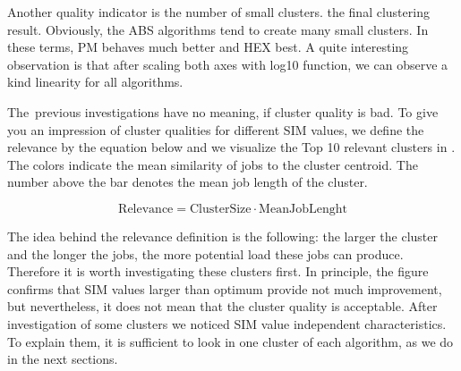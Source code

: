 \documentclass[]{llncs}
\begin{document}
Another quality indicator is the number of small clusters.
 the final clustering result.
Obviously, the ABS algorithms tend to create many small clusters.
In these terms, PM behaves much better and HEX best.
A quite interesting observation is that after scaling both axes with log10 function, we can observe a kind linearity for all algorithms.

The\ previous investigations have no meaning, if cluster quality is bad.
To give you an  impression of cluster qualities for different SIM values, we define the relevance by the equation below and we visualize the Top 10 relevant clusters in
.
The colors indicate the mean similarity of jobs to the cluster centroid.
The number above the bar denotes the mean job length of the cluster.

\begin{equation}
\text{Relevance} = \text{ClusterSize} \cdot \text{MeanJobLenght}
\end{equation}


The idea behind the relevance definition is the following: the larger the cluster and the longer the jobs, the more potential load these jobs can produce.
Therefore it is worth investigating these clusters first.
In principle, the figure confirms that SIM values larger than optimum provide not much improvement, but nevertheless, it does not mean that the cluster quality is acceptable.
After investigation of some clusters we noticed SIM value independent characteristics.
To explain them, it is sufficient to look in one cluster of each algorithm, as we do in the next sections.
\end{document}

